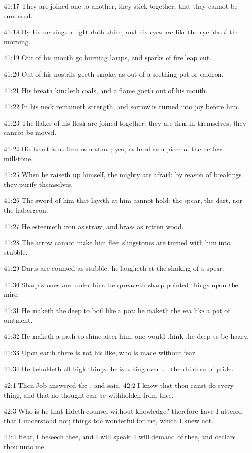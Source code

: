 41:17 They are joined one to another, they stick together, that they cannot be sundered.

41:18 By his neesings a light doth shine, and his eyes are like the eyelids of the morning.

41:19 Out of his mouth go burning lamps, and sparks of fire leap out.

41:20 Out of his nostrils goeth smoke, as out of a seething pot or caldron.

41:21 His breath kindleth coals, and a flame goeth out of his mouth.

41:22 In his neck remaineth strength, and sorrow is turned into joy before him.

41:23 The flakes of his flesh are joined together: they are firm in themselves; they cannot be moved.

41:24 His heart is as firm as a stone; yea, as hard as a piece of the nether millstone.

41:25 When he raiseth up himself, the mighty are afraid: by reason of breakings they purify themselves.

41:26 The sword of him that layeth at him cannot hold: the spear, the dart, nor the habergeon.

41:27 He esteemeth iron as straw, and brass as rotten wood.

41:28 The arrow cannot make him flee: slingstones are turned with him into stubble.

41:29 Darts are counted as stubble: he laugheth at the shaking of a spear.

41:30 Sharp stones are under him: he spreadeth sharp pointed things upon the mire.

41:31 He maketh the deep to boil like a pot: he maketh the sea like a pot of ointment.

41:32 He maketh a path to shine after him; one would think the deep to be hoary.

41:33 Upon earth there is not his like, who is made without fear.

41:34 He beholdeth all high things: he is a king over all the children of pride.

42:1 Then Job answered the \LORD, and said, 42:2 I know that thou canst do every thing, and that no thought can be withholden from thee.

42:3 Who is he that hideth counsel without knowledge? therefore have I uttered that I understood not; things too wonderful for me, which I knew not.

42:4 Hear, I beseech thee, and I will speak: I will demand of thee, and declare thou unto me.

